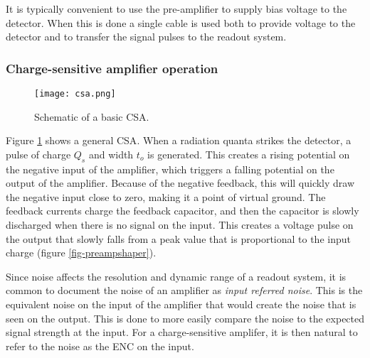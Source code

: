 \documentclass[../main/thesis.tex]{subfiles}
\begin{document}
It is typically convenient to use the pre-amplifier to supply bias voltage to the detector. When this is done a single cable is used both to provide voltage to the detector and to transfer the signal pulses to the readout system. \citep[chap. 16]{Knoll}


\subsubsection{Charge-sensitive amplifier operation}
\label{t-csa}
\begin{figure}%
	\centering
	\texttt{[image: csa.png]}
	\caption{Schematic of a basic \gls{CSA}. \citep{Hamamatsu}}
	\label{fig-csa}
\end{figure}

Figure \ref{fig-csa} shows a general \gls{CSA}. When a radiation quanta strikes the detector, a pulse of charge $Q_s$ and width $t_o$ is generated. This creates a rising potential on the negative input of the amplifier, which triggers a falling potential on the output of the amplifier. Because of the negative feedback, this will quickly draw the negative input close to zero, making it a point of virtual ground. The feedback currents charge the feedback capacitor, and then the capacitor is slowly discharged when there is no signal on the input. This creates a voltage pulse on the output that slowly falls from a peak value that is proportional to the input charge (figure \ref{fig-preampshaper}). \citep{Hamamatsu}



Since noise affects the resolution and dynamic range of a readout system, it is common to document the noise of an amplifier as \textit{input referred noise}. This is the equivalent noise on the input of the amplifier that would create the noise that is seen on the output. This is done to more easily compare the noise to the expected signal strength at the input. For a charge-sensitive amplifer, it is then natural to refer to the noise as the \acrfull{ENC} on the input.  
\end{document}
